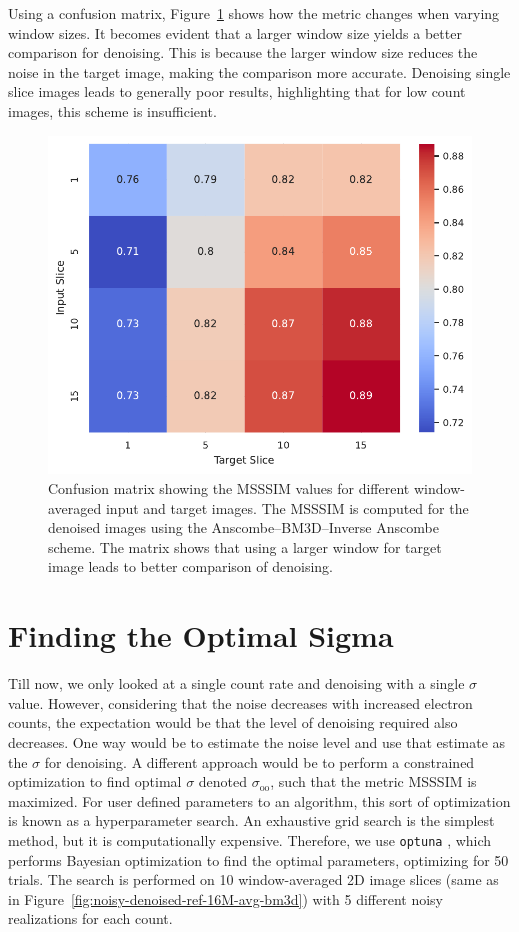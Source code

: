 Using a confusion matrix, Figure~\ref{fig:confusion_matrix_msssim_window_avg} shows how the metric changes when varying window sizes. It becomes evident that a larger window size yields a better comparison for denoising. This is because the larger window size reduces the noise in the target image, making the comparison more accurate. Denoising single slice images leads to generally poor results, highlighting that for low count images, this scheme is insufficient.

\begin{figure}[h]
    \centering
    \includegraphics[width=0.5\linewidth]{images/confusion_matrix_msssim_window_avg.pdf}
    \caption{Confusion matrix showing the \gls{MSSSIM} values for different window-averaged input and target images. The \gls{MSSSIM} is computed for the denoised images using the Anscombe--\gls{BM3D}--Inverse Anscombe scheme. The matrix shows that using a larger window for target image leads to better comparison of denoising.}
    \label{fig:confusion_matrix_msssim_window_avg}
\end{figure}

\section{Finding the Optimal Sigma}
Till now, we only looked at a single count rate and denoising with a single $\sigma$ value. However, considering that the noise decreases with increased electron counts, the expectation would be that the level of denoising required also decreases. One way would be to estimate the noise level and use that estimate as the $\sigma$ for denoising. A different approach would be to perform a constrained optimization to find optimal $\sigma$ denoted $\sigma_{\text{oo}}$, such that the metric \gls{MSSSIM} is maximized. For user defined parameters to an algorithm, this sort of optimization is known as a hyperparameter search. An exhaustive grid search is the simplest method, but it is computationally expensive. Therefore, we use \texttt{optuna} \cite{akibaOptunaNextgenerationHyperparameter2019}, which performs Bayesian optimization to find the optimal parameters, optimizing for \num{50} trials. The search is performed on \num{10} window-averaged 2D image slices (same as in Figure~\ref{fig:noisy-denoised-ref-16M-avg-bm3d}) with 5 different noisy realizations for each count.


